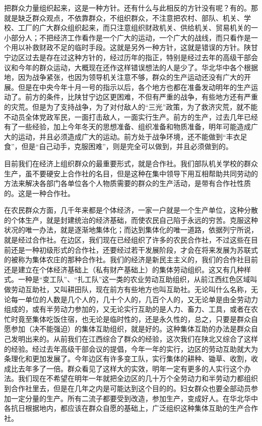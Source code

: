 把群众力量组织起来，这是一种方针。还有什么与此相反的方针没有呢？有的。那就是缺乏群众观点，不依靠群众，不组织群众，不注意把农村、部队、机关、学校、工厂的广大群众组织起来，而只注意组织财政机关、供给机关、贸易机关的一小部分人；不把经济工作看作是一个广大的运动，一个广大的战线，而只看作是一个用以补救财政不足的临时手段。这就是另外一种方针，这就是错误的方针。陕甘宁边区过去是存在过这种方针的，经过历年的指正，特别是经过去年的高级干部会议和今年的群众运动，大概现在还作这样错误想法的人是少了。华北华中各个根据地，因为战争紧张，也因为领导机关注意不够，群众的生产运动还没有广大的开展。但是在中央今年十月一号的指示以后，各个地方也都在准备发动明年的生产运动了。前方的条件，比陕甘宁边区更困难，不但有严重的战争，有些地方还有严重的灾荒。但是为了支持战争，为了对付敌人的“三光”政策，为了救济灾荒，就不能不动员全体党政军民，一面打击敌人，一面实行生产。前方的生产，过去几年已经有了一些经验，加上今年冬天的思想准备、组织准备和物质准备，明年可能造成广大的运动，并且必须造成广大的运动。前方处于战争环境，还不能做到“丰衣足食”，但是“自己动手，克服困难”，则是完全可以做到，并且必须做到的。

目前我们在经济上组织群众的最重要形式，就是合作社。我们部队机关学校的群众生产，虽不要硬安上合作社的名目，但是这种在集中领导下用互相帮助共同劳动的方法来解决各部门各单位各个人物质需要的群众的生产活动，是带有合作社性质的。这是一种合作社。

在农民群众方面，几千年来都是个体经济，一家一户就是一个生产单位，这种分散的个体生产，就是封建统治的经济基础，而使农民自己陷于永远的穷苦。克服这种状况的唯一办法，就是逐渐地集体化；而达到集体化的唯一道路，依据列宁所说，就是经过合作社。在边区，我们现在已经组织了许多的农民合作社，不过这些在目前还是一种初级形式的合作社，还要经过若干发展阶段，才会在将来发展为苏联式的被称为集体农庄的那种合作社。我们的经济是新民主主义的，我们的合作社目前还是建立在个体经济基础上（私有财产基础上）的集体劳动组织。这又有几种样式。一种是“变工队”、“扎工队”这一类的农业劳动互助组织，从前江西红色区域叫做劳动互助社，又叫耕田队，现在前方有些地方也叫互助社。无论叫什么名称，无论每一单位的人数是几个人的，几十个人的，几百个人的，又无论单是由全劳动力组成的，或有半劳动力参加的，又无论实行互助的是人力、畜力、工具，或者在农忙时竟至集体吃饭住宿，也无论是临时性的，还是永久性的，总之，只要是群众自愿参加（决不能强迫）的集体互助组织，就是好的。这种集体互助的办法是群众自己发明出来的。从前我们在江西综合了群众的经验，这次我们在陕北又综合了这样的经验。经过去年高级干部会议的提倡，今年一年的实行，边区的劳动互助就大为条理化和更加发展了。今年边区有许多变工队，实行集体的耕种、锄草、收割，收成比去年多了一倍。群众看见了这样大的实效，明年一定有更多的人实行这个办法。我们现在不希望在明年一年就把全边区的几十万个全劳动力和半劳动力都组织到合作社里去，但是在几年之内是可能达到这个目的的。妇女群众也要全部动员参加一定分量的生产。所有二流子都要受到改造，参加生产，变成好人。在华北华中各抗日根据地内，都应该在群众自愿的基础上，广泛组织这种集体互助的生产合作社。

